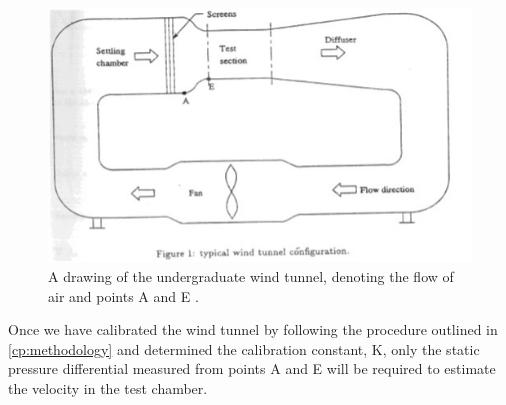 \begin{figure}[htpb]
    \centering
    \includegraphics[width=\linewidth]{Figures/wind_tunnel_drawing.png}
    \caption[Drawing of the undergraduate wind tunnel configuration]{A drawing of the undergraduate wind tunnel, denoting the flow of air and points A and E \citep{lab2-manual}.}
    \label{fig:lab_drawing}
\end{figure}
 
Once we have calibrated the wind tunnel by following the procedure outlined in \autoref{cp:methodology} and determined the calibration constant, \gls{K}, only the static pressure differential measured from points A and E will be required to estimate the velocity in the test chamber.